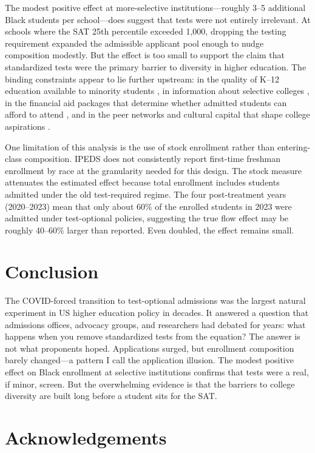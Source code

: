 \documentclass[12pt]{article}
\begin{document}
The modest positive effect at more-selective institutions---roughly 3--5 additional Black students per school---does suggest that tests were not entirely irrelevant. At schools where the SAT 25th percentile exceeded 1,000, dropping the testing requirement expanded the admissible applicant pool enough to nudge composition modestly. But the effect is too small to support the claim that standardized tests were the primary barrier to diversity in higher education. The binding constraints appear to lie further upstream: in the quality of K--12 education available to minority students \citep{Reardon2011}, in information about selective colleges \citep{Hoxby2013Missing}, in the financial aid packages that determine whether admitted students can afford to attend \citep{Dynarski2021Closing}, and in the peer networks and cultural capital that shape college aspirations \citep{Carrell2013Peers}.

One limitation of this analysis is the use of stock enrollment rather than entering-class composition. IPEDS does not consistently report first-time freshman enrollment by race at the granularity needed for this design. The stock measure attenuates the estimated effect because total enrollment includes students admitted under the old test-required regime. The four post-treatment years (2020--2023) mean that only about 60\% of the enrolled students in 2023 were admitted under test-optional policies, suggesting the true flow effect may be roughly 40--60\% larger than reported. Even doubled, the effect remains small.

\section{Conclusion}

The COVID-forced transition to test-optional admissions was the largest natural experiment in US higher education policy in decades. It answered a question that admissions offices, advocacy groups, and researchers had debated for years: what happens when you remove standardized tests from the equation? The answer is not what proponents hoped. Applications surged, but enrollment composition barely changed---a pattern I call the application illusion. The modest positive effect on Black enrollment at selective institutions confirms that tests were a real, if minor, screen. But the overwhelming evidence is that the barriers to college diversity are built long before a student sits for the SAT.

\section*{Acknowledgements}
\end{document}
